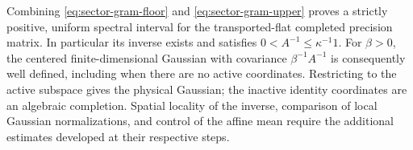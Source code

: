 Combining \eqref{eq:sector-gram-floor} and
\eqref{eq:sector-gram-upper} proves a strictly positive, uniform\linebreak
spectral interval for the transported-flat completed precision matrix.
In particular its inverse exists and satisfies
$0<A^{-1}\le\kappa^{-1}1$. For $\beta>0$, the centered finite-dimensional
Gaussian with covariance $\beta^{-1}A^{-1}$ is consequently
well defined, including when there are no active coordinates.
Restricting to the active subspace gives the physical Gaussian;
the inactive identity coordinates are an algebraic completion.
Spatial locality of the inverse, comparison of local Gaussian
normalizations, and control of the affine mean require the
additional estimates developed at their respective steps.
